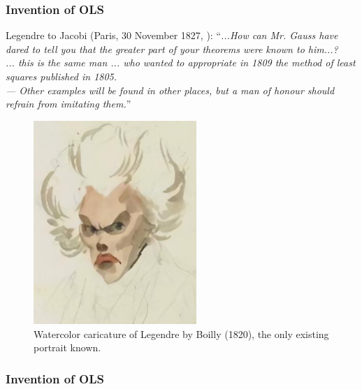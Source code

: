 \documentclass[a4paper,12pt]{article}
\begin{document}
\clearpage


\subsubsection*{Invention of OLS}
%

\begin{multicols}{2}  %

    Legendre to Jacobi (Paris, 30 November 1827, \citealp{Plackett1972}): ``\textit{...How can Mr. Gauss have dared to tell you that the greater part of your theorems were known to him...?}\\[1ex] \textit{ ... this is the same man ... who wanted to appropriate in 1809 the method of least squares published in 1805.}\\[2ex] \textit{--- Other examples will be found in other places, but a man of honour should refrain from imitating them.}''

    \columnbreak  %

    \begin{figure}[H]
        \centering
        \includegraphics[width=0.55\textwidth]{figures/Legendre}
        \caption{ Watercolor caricature of Legendre by Boilly (1820), the only existing portrait known.}
    \end{figure}

\end{multicols}  %



\subsubsection*{Invention of OLS}
%
\end{document}
